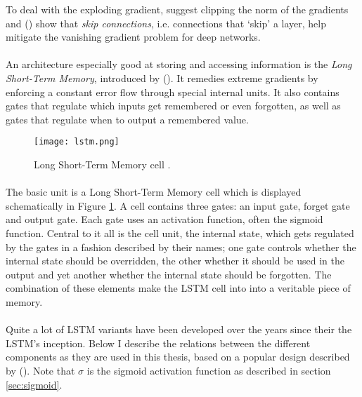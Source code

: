 To deal with the exploding gradient,
\parencite{Pascanu2012}
suggest clipping the norm of the gradients
and
\citeauthor{Graves2013} (\citeyear{Graves2013})
show that \textit{skip connections},
i.e. connections that `skip' a layer,
help mitigate the vanishing gradient problem
for deep networks.

\paragraph{}
An architecture especially good at storing and accessing information
is the \textit{Long Short-Term Memory},
introduced by \citeauthor{Hochreiter1997} (\citeyear{Hochreiter1997}).
It remedies extreme gradients
by enforcing a constant error flow through special internal units.
It also contains gates that regulate
which inputs get remembered or even forgotten,
as well as gates that regulate when to output a remembered value.

\begin{figure}[htpb]
  \centering
  \texttt{[image: lstm.png]}
  \caption[Long Short-Term Memory]{
    Long Short-Term Memory cell
  \parencite{Graves2013}.
  }
  \label{fig:lstm}
\end{figure}

\paragraph{}
The basic unit is a Long Short-Term Memory cell
which is displayed schematically in Figure \ref{fig:lstm}.
A cell contains three gates:
an input gate, forget gate and output gate.
Each gate uses an activation function,
often the sigmoid function.
Central to it all is the cell unit, the internal state,
which gets regulated by the gates
in a fashion described by their names;
one gate controls whether the internal state should be overridden,
the other whether it should be used in the output
and yet another whether the internal state should be forgotten.
The combination of these elements make the LSTM cell into
into a veritable piece of memory.

\paragraph{}
Quite a lot of LSTM variants have been developed over the years
since their the LSTM's inception.
Below I describe the relations between the different components
as they are used in this thesis,
based on a popular design described by
\citeauthor{Graves2013} (\citeyear{Graves2013}).
Note that $\sigma$ is the sigmoid activation function
as described in section \ref{sec:sigmoid}.

